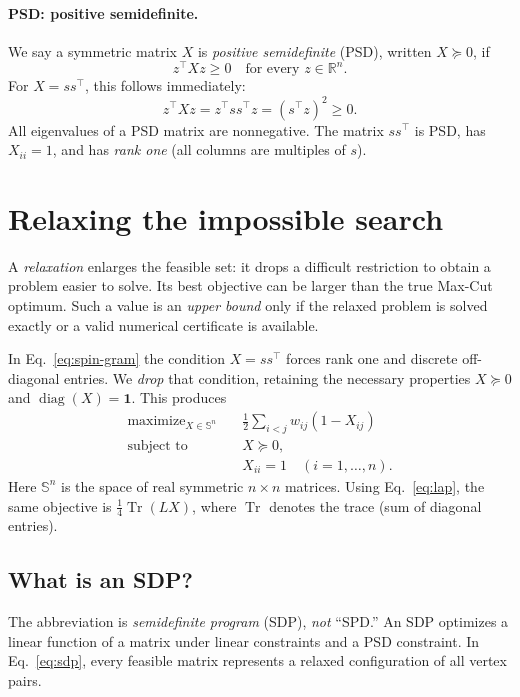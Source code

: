 \documentclass[10pt,letterpaper]{article}
\newcommand{\R}{\mathbb{R}}
\DeclareMathOperator{\diag}{diag}
\DeclareMathOperator{\Tr}{Tr}
\begin{document}
\paragraph{PSD: positive semidefinite.} We say a symmetric matrix $X$ is \emph{positive semidefinite} (PSD), written $X\succeq0$, if
\begin{equation}\label{eq:psd}
 z^\top Xz\ge0\quad\text{for every }z\in\R^n.
\end{equation}
For $X=ss^\top$, this follows immediately:
\begin{equation}
 z^\top Xz=z^\top ss^\top z=(s^\top z)^2\ge0.
\end{equation}
All eigenvalues of a PSD matrix are nonnegative. The matrix $ss^\top$ is PSD, has $X_{ii}=1$, and has \emph{rank one} (all columns are multiples of $s$).

\section{Relaxing the impossible search}
\label{sec:relax}
A \emph{relaxation} enlarges the feasible set: it drops a difficult restriction to obtain a problem easier to solve. Its best objective can be larger than the true Max-Cut optimum. Such a value is an \emph{upper bound} only if the relaxed problem is solved exactly or a valid numerical certificate is available.

In Eq.~\eqref{eq:spin-gram} the condition $X=ss^\top$ forces rank one and discrete off-diagonal entries. We \emph{drop} that condition, retaining the necessary properties $X\succeq0$ and $\diag(X)=\bm1$. This produces
\begin{equation}\label{eq:sdp}
 \boxed{\begin{aligned}
 \text{maximize}_{X\in\mathbb S^n}\quad&
 \frac12\sum_{i<j}w_{ij}(1-X_{ij})\\
 \text{subject to}\quad&X\succeq0,\\
 &X_{ii}=1\quad(i=1,\ldots,n).
 \end{aligned}}
\end{equation}
Here $\mathbb S^n$ is the space of real symmetric $n\times n$ matrices. Using Eq.~\eqref{eq:lap}, the same objective is $\tfrac14\Tr(LX)$, where $\Tr$ denotes the trace (sum of diagonal entries).

\subsection{What is an SDP?}
The abbreviation is \emph{semidefinite program} (SDP), \emph{not} ``SPD.'' An SDP optimizes a linear function of a matrix under linear constraints and a PSD constraint. In Eq.~\eqref{eq:sdp}, every feasible matrix represents a relaxed configuration of all vertex pairs.
\end{document}

